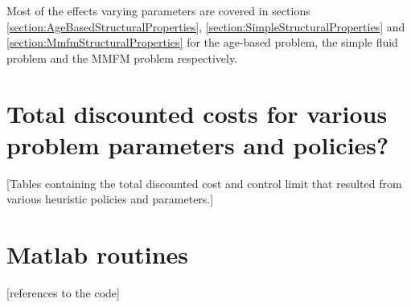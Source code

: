 Most of the effects varying parameters are covered in sections \ref{section:AgeBasedStructuralProperties}, \ref{section:SimpleStructuralProperties} and \ref{section:MmfmStructuralProperties} for the age-based problem, the simple fluid problem and the MMFM problem respectively.




\begin{appendices}
	
	
\chapter{Total discounted costs for various problem parameters and policies?}\label{AppendixComputationsTable}
[Tables containing the total discounted cost and control limit that resulted from various heuristic policies and parameters.]
\chapter{Matlab routines}
[references to the code]
\end{appendices}

